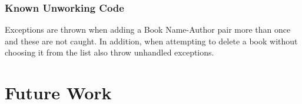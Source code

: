 \documentclass{article}
\begin{document}
\subsubsection*{Known Unworking Code}

Exceptions are thrown when adding a Book Name-Author pair more than once and these are not caught. In 
addition, when attempting to delete a book without choosing it from the list also throw unhandled exceptions.

\section*{Future Work}
\end{document}
